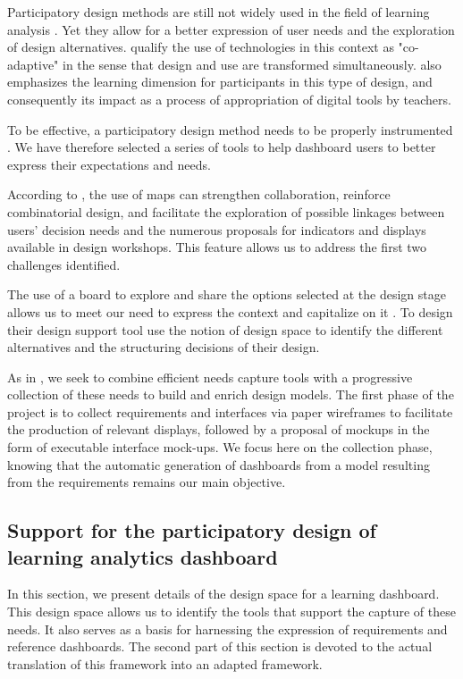 \documentclass[manuscript,screen,nonacm,12pt]{acmart}
\begin{document}
Participatory design methods are still not widely used in the field of learning analysis \cite{abel2013cross}. Yet they allow for a better expression of user needs and the exploration of design alternatives. \citet{mackay1997radicalement} qualify the use of technologies in this context as "co-adaptive" in the sense that design and use are transformed simultaneously. \citet{knibbe2016} also emphasizes the learning dimension for participants in this type of design, and consequently its impact as a process of appropriation of digital tools by teachers.

To be effective, a participatory design method needs to be properly instrumented \cite{sanders2010framework}. We have therefore selected a series of tools to help dashboard users to better express their expectations and needs.

According to \citet{lucero2016designing}, the use of maps can strengthen collaboration, reinforce combinatorial design, and facilitate the exploration of possible linkages between users' decision needs and the numerous proposals for indicators and displays available in design workshops. This feature allows us to address the first two challenges identified.

The use of a board to explore and share the options selected at the design stage allows us to meet our need to express the context and capitalize on it \cite{osterwalder2010business}. To design their design support tool \citet{hallifax2018design} use the notion of design space \cite{shaw2011role} to identify the different alternatives and the structuring decisions of their design. 

As in \cite{rivero2014mockup}, we seek to combine efficient needs capture tools with a progressive collection of these needs to build and enrich design models. The first phase of the project is to collect requirements and interfaces via paper wireframes to facilitate the production of relevant displays, followed by a proposal of mockups in the form of executable interface mock-ups. We focus here on the collection phase, knowing that the automatic generation of dashboards from a model resulting from the requirements remains our main objective.

\subsection{Support for the participatory design of learning analytics dashboard}
In this section, we present details of the design space for a learning dashboard. This design space allows us to identify the tools that support the capture of these needs. It also serves as a basis for harnessing the expression of requirements and reference dashboards. The second part of this section is devoted to the actual translation of this framework into an adapted framework.
\end{document}
